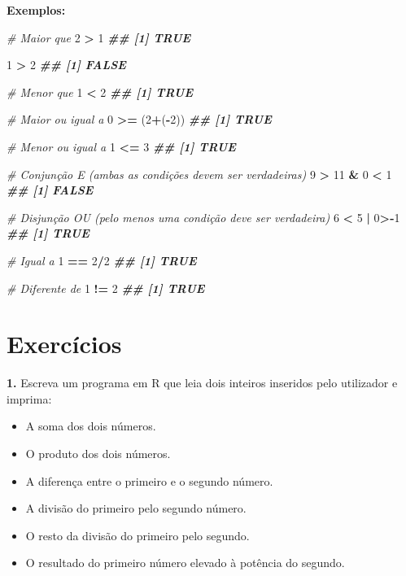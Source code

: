 \documentclass[
]{book}
\newenvironment{Shaded}{\begin{snugshade}}{\end{snugshade}}
\newcommand{\CommentTok}[1]{\textcolor[rgb]{0.56,0.35,0.01}{\textit{#1}}}
\newcommand{\DecValTok}[1]{\textcolor[rgb]{0.00,0.00,0.81}{#1}}
\newcommand{\DocumentationTok}[1]{\textcolor[rgb]{0.56,0.35,0.01}{\textbf{\textit{#1}}}}
\newcommand{\NormalTok}[1]{#1}
\newcommand{\SpecialCharTok}[1]{\textcolor[rgb]{0.81,0.36,0.00}{\textbf{#1}}}
\providecommand{\tightlist}{%
  \setlength{\itemsep}{0pt}\setlength{\parskip}{0pt}}
\begin{document}
\textbf{Exemplos:}

\begin{Shaded}
\begin{Highlighting}[]
\CommentTok{\# Maior que }
\DecValTok{2} \SpecialCharTok{\textgreater{}} \DecValTok{1}
\DocumentationTok{\#\# [1] TRUE}

\DecValTok{1} \SpecialCharTok{\textgreater{}} \DecValTok{2}
\DocumentationTok{\#\# [1] FALSE}

\CommentTok{\# Menor que}
\DecValTok{1} \SpecialCharTok{\textless{}} \DecValTok{2}
\DocumentationTok{\#\# [1] TRUE}

\CommentTok{\# Maior ou igual a}
\DecValTok{0} \SpecialCharTok{\textgreater{}=}\NormalTok{ (}\DecValTok{2}\SpecialCharTok{+}\NormalTok{(}\SpecialCharTok{{-}}\DecValTok{2}\NormalTok{))}
\DocumentationTok{\#\# [1] TRUE}

\CommentTok{\# Menor ou igual a }
\DecValTok{1} \SpecialCharTok{\textless{}=} \DecValTok{3}
\DocumentationTok{\#\# [1] TRUE}

\CommentTok{\# Conjunção E (ambas as condições devem ser verdadeiras)}
\DecValTok{9} \SpecialCharTok{\textgreater{}} \DecValTok{11} \SpecialCharTok{\&} \DecValTok{0} \SpecialCharTok{\textless{}} \DecValTok{1}
\DocumentationTok{\#\# [1] FALSE}

\CommentTok{\# Disjunção OU (pelo menos uma condição deve ser verdadeira)}
\DecValTok{6} \SpecialCharTok{\textless{}} \DecValTok{5} \SpecialCharTok{|} \DecValTok{0}\SpecialCharTok{\textgreater{}{-}}\DecValTok{1}
\DocumentationTok{\#\# [1] TRUE}

\CommentTok{\# Igual a}
\DecValTok{1} \SpecialCharTok{==} \DecValTok{2}\SpecialCharTok{/}\DecValTok{2}
\DocumentationTok{\#\# [1] TRUE}

\CommentTok{\# Diferente de}
\DecValTok{1} \SpecialCharTok{!=} \DecValTok{2}
\DocumentationTok{\#\# [1] TRUE}
\end{Highlighting}
\end{Shaded}

\section{Exercícios}\label{exercuxedcios}

\textbf{1.} Escreva um programa em R que leia dois inteiros inseridos pelo
utilizador e imprima:

\begin{itemize}
\tightlist
\item
  A soma dos dois números.
\item
  O produto dos dois números.
\item
  A diferença entre o primeiro e o segundo número.
\item
  A divisão do primeiro pelo segundo número.
\item
  O resto da divisão do primeiro pelo segundo.
\item
  O resultado do primeiro número elevado à potência do segundo.
\end{itemize}
\end{document}
